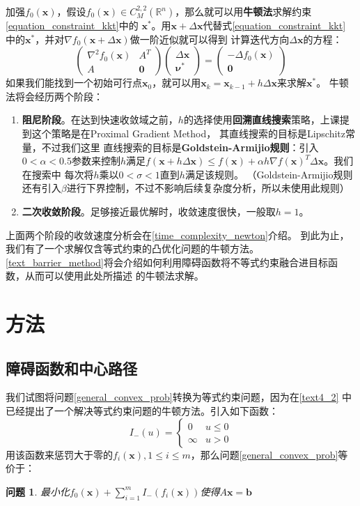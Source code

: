 \documentclass{article}
\newtheorem{problem}{问题}
\begin{document}
加强$f_0(\bm x)$，假设$f_0(\bm x)\in C_M^{2,2}(\mathbb{R}^n)$，那么就可以用\textbf{牛顿法}求解约束\eqref{equation_constraint_kkt}中的
$\bm x^*$。用$\bm x+\Delta \bm x$代替式\eqref{equation_constraint_kkt}
中的$\bm x^*$，并对$\nabla f_0(\bm x+\Delta \bm x)$做一阶近似就可以得到
计算迭代方向$\Delta \bm x$的方程：
\begin{equation}
\begin{pmatrix}
    \nabla^2f_0(\bm x) & A^T\\
    A & \bm 0
\end{pmatrix}
\begin{pmatrix}
    \Delta \bm x\\
    \bm\nu^*
\end{pmatrix}=
\begin{pmatrix}
    -\Delta f_0(\bm x)\\
    \bm 0
\end{pmatrix}\label{newton_for_equation}\end{equation}
如果我们能找到一个初始可行点$\bm x_0$，就可以用$\bm x_k=\bm x_{k-1}+h\Delta \bm x$来求解$\bm x^*$。
牛顿法将会经历两个阶段：
\begin{enumerate}
    \item \textbf{阻尼阶段}。在达到快速收敛域之前，$h$的选择使用\textbf{回溯直线搜索}策略，上课提到这个策略是在Proximal Gradient Method，
    其直线搜索的目标是Lipschitz常量，不过我们这里
    直线搜索的目标是\textbf{Goldstein-Armijio规则}：引入$0<\alpha< 0.5$参数来控制$h$满足$f(\bm x+h\Delta\bm x)\le f(\bm x)+\alpha h\nabla f(\bm x)^T\Delta\bm x$。我们在搜索中
    每次将$h$乘以$0<\sigma<1$直到$h$满足该规则。
    （Goldstein-Armijio规则还有引入$\beta$进行下界控制，不过不影响后续复杂度分析，所以未使用此规则）
    \item \textbf{二次收敛阶段}。足够接近最优解时，收敛速度很快，一般取$h=1$。
\end{enumerate}
上面两个阶段的收敛速度分析会在\ref{time_complexity_newton}介绍。
到此为止，我们有了一个求解仅含等式约束的凸优化问题的牛顿方法。
\ref{text_barrier_method}将会介绍如何利用障碍函数将不等式约束融合进目标函数，从而可以使用此处所描述
的牛顿法求解。
\label{text4_2}
\section{方法}
\subsection{障碍函数和中心路径}
我们试图将问题\ref{general_convex_prob}转换为等式约束问题，因为在\ref{text4_2}
中已经提出了一个解决等式约束问题的牛顿方法。引入如下函数：
$$I_-(u)=\begin{cases}
    0 & u\le 0 \\
    \infty & u > 0
\end{cases}$$
用该函数来惩罚大于零的$f_i(\bm x),1\le i\le m$，那么问题\ref{general_convex_prob}等价于：
\begin{problem}
最小化$f_0(\bm x)+\sum_{i=1}^m{I_-(f_i(\bm x))}$使得$A\bm x=\bm b$
\label{barrier_problem}
\end{problem}
\end{document}
